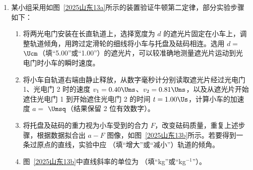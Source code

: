 \documentclass[\gkver]{gaokaozhenti}
\begin{document}
\begin{enumerate}
{由牛顿第二定律有 $qE = ma$

联立解得 $E = \frac{4mL}{qt_{0}^{2}}$

A 正确；

B．粒子在区域 Ⅱ 中运动的 $y-t$ 图像为正弦曲线的一部分，可以判断粒子做匀速圆周运动，


运动轨迹如图所示，则粒子在区域 Ⅱ 内圆周运动的半径 $R = \frac{10}{3}L$

B 错误；

C．粒子做类平抛运动进入匀强磁场时的速度 $v = \sqrt{v_{0}^{2} + (at)^{2}}$

联立解得 $v = \frac{5L}{t_{0}}$

根据洛伦兹力提供向心力有 $qvB = m\frac{v^{2}}{R}$

解得 $B = \frac{3m}{2qt_{0}}$

C 错误；

D．如图所示，


设圆心为 $O'$ 点，设粒子进入匀强磁场时的速度方向与竖直方向夹角为 $\theta$

由速度关系有 $\sin\theta = \frac{v_{0}}{v} = 0.6$

可得 $\theta = 37^{\circ}$

由几何关系得 $\angle O' = 37^{\circ}$

那么有 $OO' = 3L + R\sin 37^{\circ} = \frac{17}{3}L$

粒子在区域 Ⅱ 内圆周运动的圆心坐标 $\left(\frac{17}{3}L, 0\right)$

D 正确。

故选 AD。
}

\item
某小组采用如图~\ref{2025山东13a}所示的装置验证牛顿第二定律，部分实验步骤如下：
\begin{enumerate}
	\item
	将两光电门安装在长直轨道上，选择宽度为 $d$ 的遮光片固定在小车上，调整轨道倾角，用跨过定滑轮的细线将小车与托盘及砝码相连。选用 $d = $  $\Ucm$（填“5.00”或“1.00”）的遮光片，可以较准确地测量遮光片运动到光电门时小车的瞬时速度。
	\item
	将小车自轨道右端由静止释放，从数字毫秒计分别读取遮光片经过光电门 1、光电门 2 时的速度 $v_{1} = 0.40 \Ums$、$v_{2} = 0.81 \Ums$，以及从遮光片开始遮住光电门 1 到开始遮住光电门 2 的时间 $t = 1.00 \Us$，计算小车的加速度 $a = $  $\Umsq$（结果保留 2 位有效数字）。
	\item
	将托盘及砝码的重力视为小车受到的合力 $F$，改变砝码质量，重复上述步骤，根据数据拟合出 $a-F$ 图像，如图~\ref{2025山东13b}所示。若要得到一条过原点的直线，实验中应 （填“增大”或“减小”）轨道的倾角。
	\item
	图~\ref{2025山东13b}中直线斜率的单位为 （填“kg”或“kg$^{-1}$”）。
\end{enumerate}


\end{enumerate}
\end{document}
